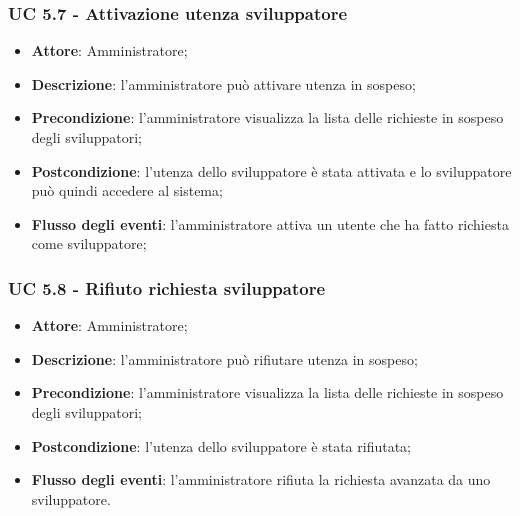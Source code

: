 \subsubsection{UC 5.7 - Attivazione utenza sviluppatore}
\begin{itemize}
\item \textbf{Attore}: Amministratore;
\item \textbf{Descrizione}: l'amministratore può attivare utenza in sospeso;
\item \textbf{Precondizione}: l'amministratore visualizza la lista delle richieste in sospeso degli sviluppatori;
\item \textbf{Postcondizione}: l'utenza dello sviluppatore è stata attivata e lo sviluppatore può quindi accedere al sistema;
\item \textbf{Flusso degli eventi}: l'amministratore attiva un utente che ha fatto richiesta come sviluppatore;
\end{itemize}

\subsubsection{UC 5.8 - Rifiuto richiesta sviluppatore}
\begin{itemize}
\item \textbf{Attore}: Amministratore;
\item \textbf{Descrizione}: l'amministratore può rifiutare utenza in sospeso;
\item \textbf{Precondizione}: l'amministratore visualizza la lista delle richieste in sospeso degli sviluppatori;
\item \textbf{Postcondizione}: l'utenza dello sviluppatore è stata rifiutata;
\item \textbf{Flusso degli eventi}: l'amministratore rifiuta la richiesta avanzata da uno sviluppatore.
\end{itemize}

